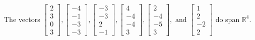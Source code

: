 \begin{exercise}
\begin{exerciseStatement}
  \end{exerciseStatement}
  \begin{exerciseAnswer}
   The vectors \(\left[\begin{array}{r}
2 \\
3 \\
0 \\
3
\end{array}\right] , \left[\begin{array}{r}
-4 \\
-1 \\
-3 \\
-3
\end{array}\right] , \left[\begin{array}{r}
-3 \\
-3 \\
2 \\
-1
\end{array}\right] , \left[\begin{array}{r}
4 \\
-4 \\
-4 \\
3
\end{array}\right] , \left[\begin{array}{r}
2 \\
-4 \\
-5 \\
3
\end{array}\right] , \text{ and } \left[\begin{array}{r}
1 \\
2 \\
-2 \\
2
\end{array}\right]\) 
  	 do  
	span \(\mathbb{R}^4\).
  


  \end{exerciseAnswer}
\end{exercise}
